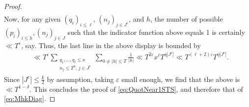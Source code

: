 \documentclass[10pt,a4paper]{amsart}
\begin{document}
\begin{proof}
\begin{align*}
    \end{align*}
    Now, for any given $(q_i)_{i\leq \ell}$, $(n_j)_{j\in J^c}$, and $h$, the number of possible $(p_i)_{i\leq h},(n_j)_{j\in J}$ such that the indicator function above equals 1 is certainly $\ll T^{\varepsilon}$, say. Thus, the last line in the above display is bounded by
    \begin{align*}
        &\ll T^{\varepsilon} \sum_{\substack{q_1,\dots,q_\ell \leq x \\ n_j\leq T^\eta,\, j\in J^c}}  \sum_{0\neq |h| \leq T} \frac{1}{|h|}
        \ll T^{2\varepsilon}  x^{\ell} T^{\eta |J^c|} 
        \ll T^{(\ell + 2)\varepsilon} T^{\eta |J^c|}.
    \end{align*}
    Since $|J^c|\leq \frac k2$ by assumption, taking $\varepsilon$ small enough, we find that the above is $\ll T^{1-\delta}$. This concludes the proof of \eqref{eq:QuotNear1STS}, and therefore that of \eqref{eq:MhkDiag}.
\end{proof}
\end{document}
